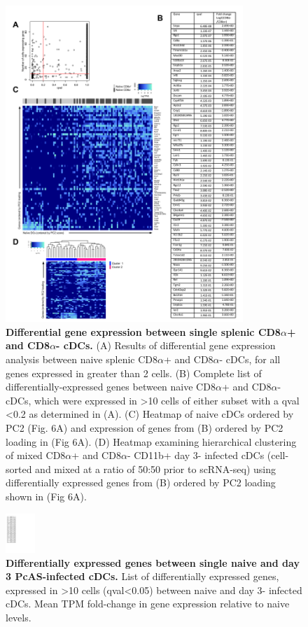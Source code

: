 \begin{figure}
    \centering
    \includegraphics[width=0.8\textwidth]{"Fig S22 rev3"}
    \caption[Differential gene expression between single splenic CD8\( \alpha \)+ and CD8\( \alpha \)- cDCs]{\textbf{Differential gene expression between single splenic CD8\( \alpha \)+ and CD8\( \alpha \)- cDCs.} (A) Results of differential gene expression analysis between naive splenic CD8\( \alpha \)+ and CD8\( \alpha \)- cDCs, for all genes expressed in greater than 2 cells. (B) Complete list of differentially-expressed genes between naive CD8\( \alpha \)+ and CD8\( \alpha \)- cDCs, which were expressed in >10 cells of either subset with a qval <0.2 as determined in (A). (C) Heatmap of naive cDCs ordered by PC2 (Fig. 6A) and expression of genes from (B) ordered by PC2 loading in (Fig 6A). (D) Heatmap examining hierarchical clustering of mixed CD8\( \alpha \)+ and CD8\( \alpha \)- CD11b+ day 3- infected cDCs (cell-sorted and mixed at a ratio of 50:50 prior to scRNA-seq) using differentially expressed genes from (B) ordered by PC2 loading shown in (Fig 6A).}
    \label{fig:ms22}
\end{figure}

\begin{figure}
    \centering
    \includegraphics[width=0.1\textwidth]{"Fig S23 rev3"}
    \caption[Differentially expressed genes between single naive and day 3 PcAS-infected cDCs]{\textbf{Differentially expressed genes between single naive and day 3 PcAS-infected cDCs.} List of differentially expressed genes, expressed in >10 cells (qval<0.05) between naive and day 3- infected cDCs. Mean TPM fold-change in gene expression relative to naive levels.}
\end{figure}

